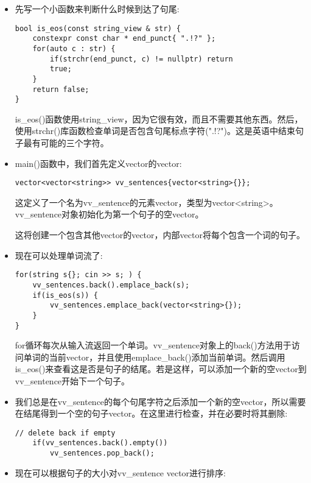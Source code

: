 \begin{itemize}
\item 
先写一个小函数来判断什么时候到达了句尾:

\begin{lstlisting}[style=styleCXX]
bool is_eos(const string_view & str) {
	constexpr const char * end_punct{ ".!?" };
	for(auto c : str) {
		if(strchr(end_punct, c) != nullptr) return
		true;
	}
	return false;
}
\end{lstlisting}

is\_eos()函数使用string\_view，因为它很有效，而且不需要其他东西。然后，使用strchr()库函数检查单词是否包含句尾标点字符(".!?")。这是英语中结束句子最有可能的三个字符。

\item 
main()函数中，我们首先定义vector的vector:

\begin{lstlisting}[style=styleCXX]
vector<vector<string>> vv_sentences{vector<string>{}};
\end{lstlisting}

这定义了一个名为vv\_sentence的元素vector，类型为vector<string>。vv\_sentence对象初始化为第一个句子的空vector。

这将创建一个包含其他vector的vector，内部vector将每个包含一个词的句子。

\item 
现在可以处理单词流了:

\begin{lstlisting}[style=styleCXX]
for(string s{}; cin >> s; ) {
	vv_sentences.back().emplace_back(s);
	if(is_eos(s)) {
		vv_sentences.emplace_back(vector<string>{});
	}
}
\end{lstlisting}

for循环每次从输入流返回一个单词。vv\_sentence对象上的back()方法用于访问单词的当前vector，并且使用emplace\_back()添加当前单词。然后调用is\_eos()来查看这是否是句子的结尾。若是这样，可以添加一个新的空vector到vv\_sentence开始下一个句子。

\item 
我们总是在vv\_sentence的每个句尾字符之后添加一个新的空vector，所以需要在结尾得到一个空的句子vector。在这里进行检查，并在必要时将其删除:

\begin{lstlisting}[style=styleCXX]
	// delete back if empty
	if(vv_sentences.back().empty())
		vv_sentences.pop_back();
\end{lstlisting}

\item 
现在可以根据句子的大小对vv\_sentence vector进行排序:


\end{itemize}
